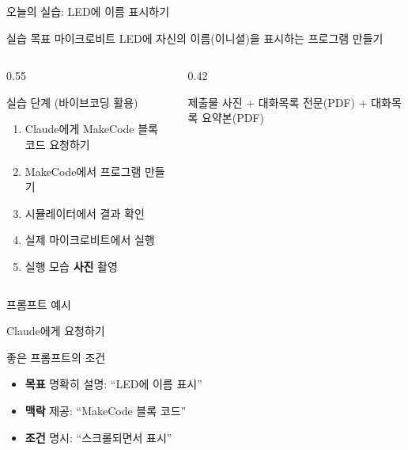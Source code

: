 \documentclass[aspectratio=169, 11pt]{beamer}
\begin{document}
\begin{frame}{오늘의 실습: LED에 이름 표시하기}
\begin{block}{실습 목표}
마이크로비트 LED에 자신의 이름(이니셜)을 표시하는 프로그램 만들기
\end{block}

\begin{columns}[T, totalwidth=\textwidth]
\begin{column}{0.55\textwidth}
\begin{exampleblock}{실습 단계 (바이브코딩 활용)}
\small
\begin{enumerate}
    \item Claude에게 MakeCode 블록 코드 요청하기
    \item MakeCode에서 프로그램 만들기
    \item 시뮬레이터에서 결과 확인
    \item 실제 마이크로비트에서 실행
    \item 실행 모습 \textbf{사진} 촬영
\end{enumerate}
\end{exampleblock}
\end{column}
\hfill
\begin{column}{0.42\textwidth}
\begin{alertblock}{제출물}
\small
사진 + 대화목록 전문(PDF) + 대화목록 요약본(PDF)
\end{alertblock}
\end{column}
\end{columns}
\end{frame}

\begin{frame}{프롬프트 예시}
\begin{block}{Claude에게 요청하기}
\begin{center}
\end{center}
\end{block}

\begin{exampleblock}{좋은 프롬프트의 조건}
\scriptsize
\begin{itemize}
    \item \textbf{목표} 명확히 설명: ``LED에 이름 표시''
    \item \textbf{맥락} 제공: ``MakeCode 블록 코드''
    \item \textbf{조건} 명시: ``스크롤되면서 표시''
\end{itemize}
\end{exampleblock}
\end{frame}
\end{document}
